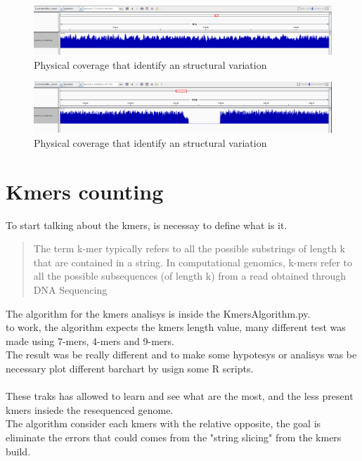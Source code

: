  \begin{figure}[H]
				\centering
				\includegraphics[scale=0.6]{immagini/sequence_coverage_2.png}
				\caption{Physical coverage that identify an structural variation}\label{fig:10}
				\end{figure}
				
				
				
 \begin{figure}[H]
				\centering
				\includegraphics[scale=0.6]{immagini/sequence_coverage_3.png}
				\caption{Physical coverage that identify an structural variation}\label{fig:11}
				\end{figure}	
\section{Kmers counting}
To start talking about the kmers, is necessay to define what is it.
\begin{quote}
The term k-mer typically refers to all the possible substrings of length k that are contained in a string. In computational genomics, k-mers refer to all the possible subsequences (of length k) from a read obtained through DNA Sequencing
\end{quote}

The algorithm for the kmers analisys is inside the KmersAlgorithm.py.\\
to work, the algorithm expects the kmers length value, many different test was made using 7-mers, 4-mers and 9-mers.\\
The result was be really different and to make some hypotesys or analisys was be necessary plot different barchart by usign some R scripts.\\\\

These traks has allowed to learn and see what are the most, and the less present kmers insiede the resequenced genome.\\

The algorithm consider each kmers with the relative opposite, the goal is eliminate the errors that could comes from the "string slicing" from the kmers build.

